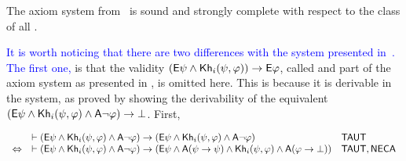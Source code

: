 \medskip

\begin{theorem}\label{th:khi-completeness}
The axiom system from~ is sound and strongly complete with respect to the class of all \ultss.
\end{theorem}

\medskip

\textcolor{blue}{It is worth noticing that there are two differences with the system presented in~\cite{AFSVQ23report}. The first one,} is that the validity $\left({\sf E}\psi \land {\sf Kh}_i(\psi,\varphi)\right) \rightarrow {\sf E}\varphi$, called  and part of the axiom system as presented in \cite{AFSVQ23report}, is omitted here. This is because it is derivable in the system, as proved by showing the derivability of the equivalent $({\sf E}\psi \wedge {\sf Kh}_i(\psi,\varphi) \wedge {\sf A}\neg\varphi) \rightarrow \bot$. First,
%
%
%
%
%
\begin{spcenter}
\begin{small}
$\begin{array}{lll}
                  & \vdash ({\sf E}\psi \wedge {\sf Kh}_i(\psi,\varphi) \wedge {\sf A}\neg\varphi) \rightarrow ({\sf E}\psi \wedge {\sf Kh}_i(\psi,\varphi) \wedge {\sf A}\neg\varphi)                                 & \textsf{TAUT} \\ 
  \Leftrightarrow & \vdash ({\sf E}\psi \wedge {\sf Kh}_i(\psi,\varphi) \wedge {\sf A}\neg\varphi) \rightarrow ({\sf E}\psi \wedge {\sf A}(\psi \rightarrow \psi) \wedge {\sf Kh}_i(\psi,\varphi) \wedge {\sf A}(\varphi \rightarrow \bot)) & \textsf{TAUT},\textsf{NECA}
\end{array}$
\end{small}
\end{spcenter}
%
%
